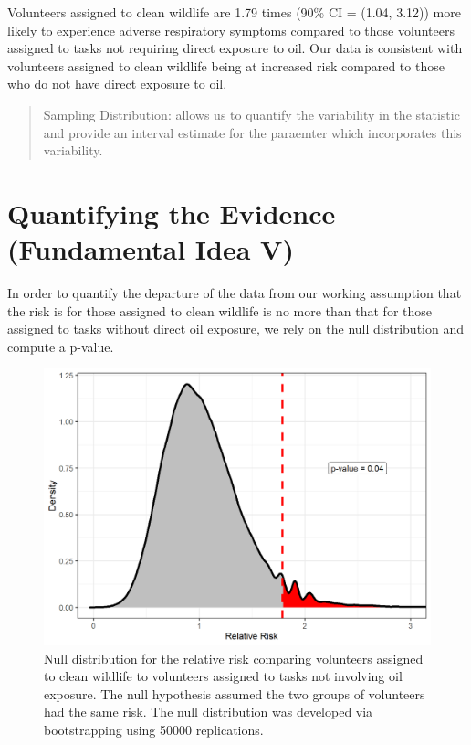 \documentclass[
]{book}
\theoremstyle{plain}
\theoremstyle{mydefn}
\theoremstyle{myexmpl}
\theoremstyle{remark}
\begin{document}
Volunteers assigned to clean wildlife are 1.79 times (90\% CI = (1.04, 3.12)) more likely to experience adverse respiratory symptoms compared to those volunteers assigned to tasks not requiring direct exposure to oil. Our data is consistent with volunteers assigned to clean wildlife being at increased risk compared to those who do not have direct exposure to oil.

\begin{quote}
Sampling Distribution: allows us to quantify the variability in the statistic and provide an interval estimate for the paraemter which incorporates this variability.
\end{quote}

\hypertarget{quantifying-the-evidence-fundamental-idea-v}{%
\section{Quantifying the Evidence (Fundamental Idea V)}\label{quantifying-the-evidence-fundamental-idea-v}}

In order to quantify the departure of the data from our working assumption that the risk is for those assigned to clean wildlife is no more than that for those assigned to tasks without direct oil exposure, we rely on the null distribution and compute a p-value.

\begin{figure}

{\centering \includegraphics[width=0.8\linewidth]{./Images/recaplanguage-null-distribution-1} 

}

\caption{Null distribution for the relative risk comparing volunteers assigned to clean wildlife to volunteers assigned to tasks not involving oil exposure.  The null hypothesis assumed the two groups of volunteers had the same risk.  The null distribution was developed via bootstrapping using 50000 replications.}\label{fig:recaplanguage-null-distribution}
\end{figure}
\end{document}
